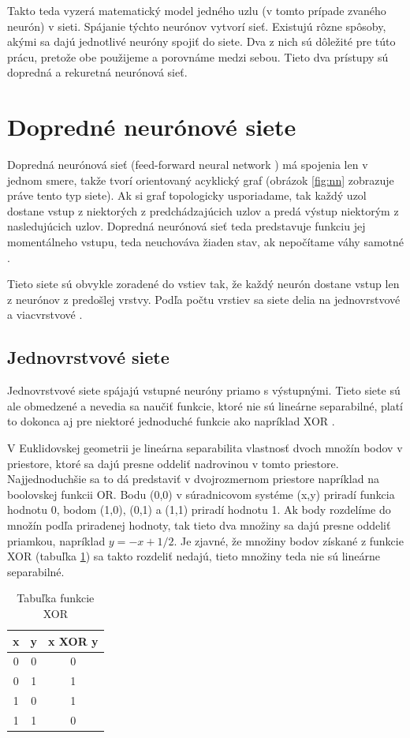 Takto teda vyzerá matematický model jedného uzlu (v tomto prípade zvaného neurón) v sieti.
Spájanie týchto neurónov vytvorí sieť.
Existujú rôzne spôsoby, akými sa dajú jednotlivé neuróny spojiť do siete.
Dva z nich sú dôležité pre túto prácu, pretože obe použijeme a porovnáme medzi sebou.
Tieto dva prístupy sú dopredná a rekuretná neurónová sieť.

\section{Dopredné neurónové siete}
Dopredná neurónová sieť (feed-forward neural network ) má spojenia len v jednom smere, takže tvorí orientovaný acyklický graf (obrázok \ref{fig:nn} zobrazuje práve tento typ siete).
Ak si graf topologicky usporiadame, tak každý uzol dostane vstup z niektorých z predchádzajúcich uzlov a predá výstup niektorým z nasledujúcich uzlov.
Dopredná neurónová sieť teda predstavuje funkciu jej momentálneho vstupu, teda neuchováva žiaden stav, ak nepočítame váhy samotné \citep{aima}.

Tieto siete sú obvykle zoradené do vstiev tak, že každý neurón dostane vstup len z neurónov z predošlej vrstvy.
Podľa počtu vrstiev sa siete delia na jednovrstvové a viacvrstvové .

\subsection{Jednovrstvové siete}
Jednovrstvové siete spájajú vstupné neuróny priamo s výstupnými.
Tieto siete sú ale obmedzené a nevedia sa naučiť funkcie, ktoré nie sú lineárne separabilné, platí to dokonca aj pre niektoré jednoduché funkcie ako napríklad XOR \citep{aima}. 

V Euklidovskej geometrii je lineárna separabilita vlastnosť dvoch množín bodov v priestore, ktoré sa dajú presne oddeliť nadrovinou v tomto priestore. 
Najjednoduchšie sa to dá predstaviť v dvojrozmernom priestore napríklad na boolovskej funkcii OR. Bodu (0,0) v súradnicovom systéme (x,y) priradí funkcia hodnotu 0, bodom (1,0), (0,1) a (1,1) priradí hodnotu 1. Ak body rozdelíme do množín podľa priradenej hodnoty, tak tieto dva množiny sa dajú presne oddeliť priamkou, napríklad $y = -x + 1/2$. Je zjavné, že množiny bodov získané z funkcie XOR (tabuľka \ref{xor}) sa takto rozdeliť nedajú, tieto množiny teda nie sú lineárne separabilné.

\begin{table}[h]
\begin{center}
\begin{tabular}{ |c|c|c| } 
 \hline 
 x & y & x XOR y \\ 
 \hline
 0 & 0 & 0 \\ 
 0 & 1 & 1 \\ 
 1 & 0 & 1 \\ 
 1 & 1 & 0 \\ 
 \hline
\end{tabular}
\caption{Tabuľka funkcie XOR}
\label{xor}
\end{center}
\end{table}

